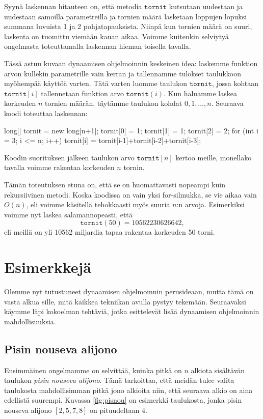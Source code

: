Syynä laskennan hitauteen on, että metodia $\texttt{tornit}$
kutsutaan uudestaan ja uudestaan samoilla parametreilla
ja tornien määrä lasketaan loppujen lopuksi summana
luvuista 1 ja 2 pohjatapauksista.
Niinpä kun tornien määrä on suuri,
laskenta on tuomittu viemään kauan aikaa.
Voimme kuitenkin selviytyä ongelmasta toteuttamalla
laskennan hieman toisella tavalla.

Tässä astuu kuvaan dynaamisen ohjelmoinnin keskeinen idea:
laskemme funktion arvon kullekin parametrille vain kerran
ja tallennamme tulokset taulukkoon myöhempää käyttöä varten.
Tätä varten luomme taulukon $\texttt{tornit}$,
jossa kohtaan $\texttt{tornit}[i]$ tallennetaan funktion
arvo $\texttt{tornit}(i)$.
Kun haluamme laskea korkeuden $n$ tornien määrän,
täytämme taulukon kohdat $0,1,\dots,n$.
Seuraava koodi toteuttaa laskennan:

\begin{code}
long[] tornit = new long[n+1];
tornit[0] = 1;
tornit[1] = 1;
tornit[2] = 2;
for (int i = 3; i <= n; i++) {
    tornit[i] = tornit[i-1]+tornit[i-2]+tornit[i-3];
}
\end{code}

Koodin suorituksen jälkeen taulukon arvo $\texttt{tornit}[n]$
kertoo meille, monellako tavalla voimme rakentaa
korkeuden $n$ tornin.

Tämän toteutuksen etuna on, että se on huomattavasti
nopeampi kuin rekursiivinen metodi.
Koska koodissa on vain yksi for-silmukka, se vie aikaa
vain $O(n)$, eli voimme käsitellä tehokkaasti myös
suuria $n$:n arvoja.
Esimerkiksi voimme nyt laskea salamannopeasti, että
\[
\texttt{tornit}(50) = 10562230626642,
\]
eli meillä on yli 10562 miljardia tapaa rakentaa korkeuden 50 torni.

\section{Esimerkkejä}

Olemme nyt tutustuneet dynaamisen ohjelmoinnin perusideaan,
mutta tämä on vasta alkua sille, mitä kaikkea tekniikan
avulla pystyy tekemään.
Seuraavaksi käymme läpi kokoelman tehtäviä,
jotka esittelevät lisää dynaamisen ohjelmoinnin mahdollisuuksia.

\subsection{Pisin nouseva alijono}

Ensimmäinen ongelmamme on selvittää, kuinka pitkä on
$n$ alkiota sisältävän taulukon \emph{pisin nouseva alijono}.
Tämä tarkoittaa, että meidän tulee valita taulukosta
mahdollisimman pitkä jono alkioita niin,
että seuraava alkio on aina edellistä suurempi.
Kuvassa \ref{fig:pisnou} on esimerkki taulukosta,
jonka pisin nouseva alijono $[2,5,7,8]$ on pituudeltaan 4.

